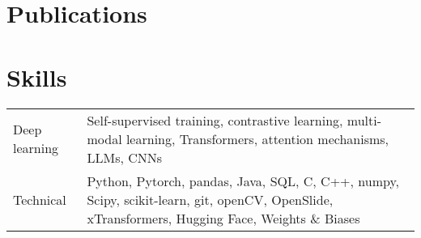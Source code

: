 \documentclass[a4paper,12pt]{article}
\begin{document}
\section{Publications}
\begin{refsection}
\nocite{*}
\printbibliography[heading=none]
\end{refsection}

\section{Skills}
\begin{tabularx}{\linewidth}{@{}l X@{}}
Deep learning & \normalsize{Self-supervised training, contrastive learning, multi-modal learning, Transformers, attention mechanisms, LLMs, CNNs}\\
Technical &  \normalsize{Python, Pytorch, pandas, Java, SQL, C, C++,  numpy, Scipy, scikit-learn, git, openCV, OpenSlide, xTransformers, Hugging Face, Weights \& Biases} 
\end{tabularx}

\vfill
{}
\end{document}
